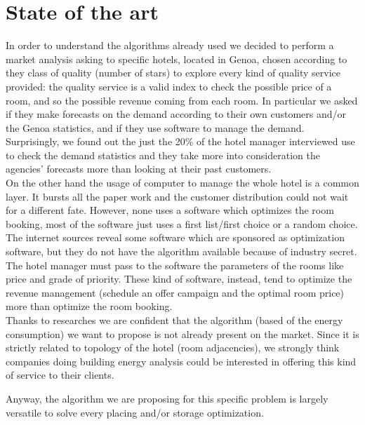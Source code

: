 \section{State of the art}
In order to understand the algorithms already used we decided to perform a market analysis asking to specific hotels, located in Genoa, chosen according to they class of quality (number of stars) to explore every kind of quality service provided: the quality service is a valid index to check the possible price of a room, and so the possible revenue coming from each room. In particular we asked if they make forecasts on the demand according to their own customers and/or the Genoa statistics, and if they use software to manage the demand. Surprisingly, we found out the just the 20\% of the hotel manager interviewed use to check the demand statistics and they take more into consideration the agencies' forecasts more than looking at their past customers. \\
On the other hand the usage of computer to manage the whole hotel is a common layer. It bursts all the paper work and the customer distribution could not wait for a different fate. However, none  uses a software which optimizes the room booking, most of the software just uses a first list/first choice or a random choice. The internet sources reveal some software which are sponsored as optimization software, but they do not have the algorithm available because of industry secret. The hotel manager must pass to the software the parameters of the rooms like price and grade of priority. These kind of software, instead, tend to optimize the revenue management (schedule an offer campaign and the optimal room price) more than optimize the room booking.\\
Thanks to researches we are confident that the algorithm (based of the energy consumption) we want to propose is not already present on the market. Since it is strictly related to topology of the hotel (room adjacencies), we strongly think companies doing building energy analysis could be interested in offering this kind of service to their clients.

Anyway, the algorithm we are proposing for this specific problem is largely versatile to solve every placing and/or storage optimization.

